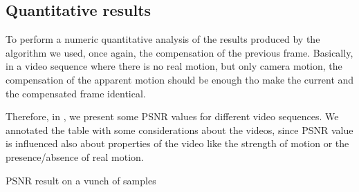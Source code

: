 \subsection{Quantitative results}

To perform a numeric quantitative analysis of the results produced by the algorithm we used, once again, the compensation of the previous frame. Basically, in a video sequence where there is no real motion, but only camera motion, the compensation of the apparent motion should be enough tho make the current and the compensated frame identical.

Therefore, in , we present some PSNR values for different video sequences. We annotated the table with some considerations about the videos, since PSNR value is influenced also about properties of the video like the strength of motion or the presence/absence of real motion.

\begin{table}
    \label{tab:psnr}
    
    \caption{PSNR result on a vunch of samples}
\end{table}    
